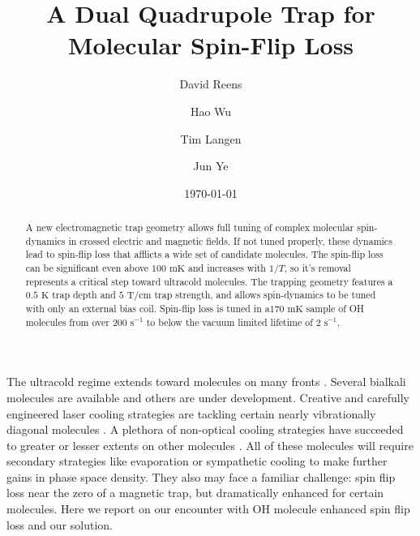 \documentclass[%
 reprint,
 amsmath,amssymb,
 aps,
prl,
]{revtex4-1}
\begin{document}

\title{A Dual Quadrupole Trap for Molecular Spin-Flip Loss}%


\author{David Reens}%
\author{Hao Wu}
\author{Tim Langen}%
\author{Jun Ye}
%

\date{\today}%


\begin{abstract}
A new electromagnetic trap geometry allows full tuning of complex molecular spin-dynamics in crossed electric and magnetic fields. If not tuned properly, these dynamics lead to spin-flip loss that afflicts a wide set of candidate molecules. The spin-flip loss can be significant even above $100\text{ mK}$ and increases with $1/T$, so it's removal represents a critical step toward ultracold molecules. The trapping geometry features a $0.5 \text{ K}$ trap depth and $5 \text{ T/cm}$ trap strength, and allows spin-dynamics to be tuned with only an external bias coil. Spin-flip loss is tuned in a$170 \text{ mK}$ sample of OH molecules from over $200 \text{ s}^{-1} $ to below the vacuum limited lifetime of $2 \text{ s}^{-1}$.
\end{abstract}


\maketitle


%
%
The ultracold regime extends toward molecules on many fronts \cite{Carr2009}. Several bialkali molecules are available \cite{Ni2008, Takekoshi2014, Park2015} and others are under development. Creative and carefully engineered laser cooling strategies are tackling certain nearly vibrationally diagonal molecules \cite{Steinecker2016, Barry2014, Hemmerling2016, Hummon2013, Zhelyazkova2014}. A plethora of non-optical cooling strategies have succeeded to greater or lesser extents on other molecules \cite{Doyle1998,Prehn2016,Bethlem1999,Bochinski2003,Akerman2015}. All of these molecules will require secondary strategies like evaporation or sympathetic cooling to make further gains in phase space density. They also may face a familiar challenge: spin flip loss near the zero of a magnetic trap, but dramatically enhanced for certain molecules. Here we report on our encounter with OH molecule enhanced spin flip loss and our solution.
\end{document}
